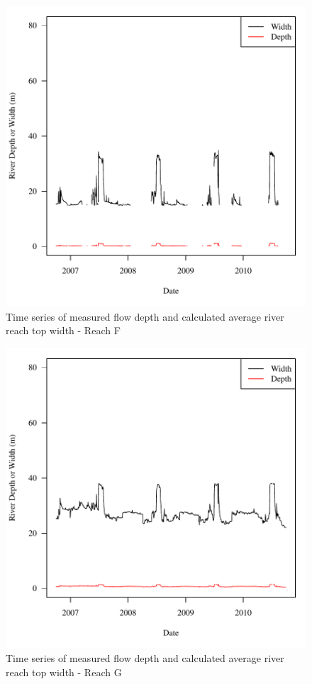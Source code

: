 \begin{center}
\begin{figure}[htbp]
	\includegraphics[width=6in]{"Figures/Results_DSR/G d&w Today F"}
	\caption{Time series of measured flow depth and calculated average river reach top width - Reach F}
\end{figure}
\end{center}
\newpage

\begin{center}
\begin{figure}[htbp]
	\includegraphics[width=6in]{"Figures/Results_DSR/G d&w Today G"}
	\caption{Time series of measured flow depth and calculated average river reach top width - Reach G}
\end{figure}
\end{center}
\newpage